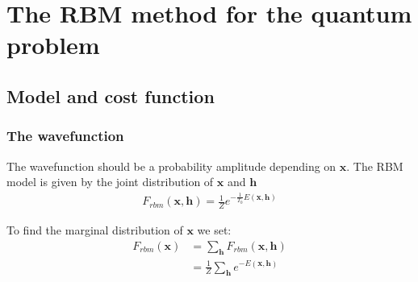 \documentclass[twoside,english]{uiofysmaster}
\newcommand{\Vx}{\mathbf{x}}
\begin{document}
\begin{comment}
		\begin{itemize}
			\item 2008 Nair, Hinton: Implicit mixtures of restricted boltzmann machine
		\end{itemize}
		\item This is a much better way of implementing an exponentially large mixture of linear models with shared latent variables than the method described in
		\begin{itemize}
			\item 1999 Hinton, Sallanes, Ghahramani: A hierarchical community of experts
		\end{itemize}
		 which uses directed linear models as the components of the mixture and a separate sig- moid belief net to decide which hidden units should be part of the current linear model. In that model, it is hard to infer the values of the binary latent variables and there can be jumps in density at the boundary be- tween two linear regions. A big advantage of switch- ing between linear models at the point where a hidden unit receives an input of exactly zero is that it avoids discontinuities in the modeled probability density.
	\end{itemize}
\end{itemize}
\end{comment}





\chapter{The RBM method for the quantum problem}
\section{Model and cost function}
\subsection{The wavefunction}
The wavefunction should be a probability amplitude depending on $\bm{x}$. The RBM model is given by the joint distribution of $\bm{x}$ and $\bm{h}$
\begin{align}
	F_{rbm}(\Vx,\mathbf{h}) = \frac{1}{Z} e^{-\frac{1}{T_0}E(\Vx,\mathbf{h})}
\end{align}

To find the marginal distribution of $\bm{x}$ we set:
\begin{align}
	F_{rbm}(\mathbf{x}) &= \sum_\mathbf{h} F_{rbm}(\mathbf{x}, \mathbf{h}) \\
				&= \frac{1}{Z}\sum_\mathbf{h} e^{-E(\mathbf{x}, \mathbf{h})}
\end{align}
\end{document}
